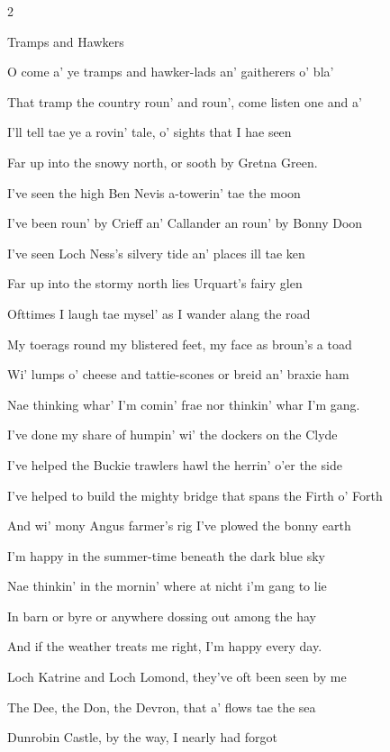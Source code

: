 \documentclass[10pt,twoside]{article}
\newcommand{\songtext}{\raggedright\fontsize{9bp}{9.15bp}\selectfont}
\newenvironment{songcolumns}
  {\begin{multicols*}{2}\songtext}
  {\end{multicols*}}
\newcommand{\songtitle}[1]{%
  \par\addvspace{9bp}%
  {\titleface\fontsize{14.5bp}{15bp}\selectfont #1\par}%
  \nobreak\vskip 2bp%
}
\newcommand{\lyric}[1]{%
  \hangindent=9bp\relax
  #1\par
}
\newenvironment{stanza}{\par\begingroup}{\par\endgroup\addvspace{4bp}}
\newcommand{\chords}[1]{%
  \par\nobreak\vskip 2bp
  {\chordface\fontsize{10bp}{11bp}\selectfont\formatchords{#1}\par}%
  \addvspace{4bp}%
}
\begin{document}
\begin{songcolumns}

\songtitle{Tramps and Hawkers}
\begin{stanza}
  \lyric{O come a' ye tramps and hawker-lads an' gaitherers o' bla'}
  \lyric{That tramp the country roun' and roun', come listen one and a'}
  \lyric{I'll tell tae ye a rovin' tale, o' sights that I hae seen}
  \lyric{Far up into the snowy north, or sooth by Gretna Green.}
  \chords{G - - - Am - - - C - - - G - - - /\\
          G - - - Em - - - G - - - Em - - - /\\
          G - - - Em - - - G - - - Em - - - /\\
          G - G7 - Am - G - - - C - G - - - /}
\end{stanza}
\begin{stanza}
  \lyric{I've seen the high Ben Nevis a-towerin' tae the moon}
  \lyric{I've been roun' by Crieff an' Callander an roun' by Bonny Doon}
  \lyric{I've seen Loch Ness's silvery tide an' places ill tae ken}
  \lyric{Far up into the stormy north lies Urquart's fairy glen}
\end{stanza}
\begin{stanza}
  \lyric{Ofttimes I laugh tae mysel' as I wander alang the road}
  \lyric{My toerags round my blistered feet, my face as broun's a toad}
  \lyric{Wi' lumps o' cheese and tattie-scones or breid an' braxie ham}
  \lyric{Nae thinking whar' I'm comin' frae nor thinkin' whar I'm gang.}
\end{stanza}
\begin{stanza}
  \lyric{I've done my share of humpin' wi' the dockers on the Clyde}
  \lyric{I've helped the Buckie trawlers hawl the herrin' o'er the side}
  \lyric{I've helped to build the mighty bridge that spans the Firth o' Forth}
  \lyric{And wi' mony Angus farmer's rig I've plowed the bonny earth}
\end{stanza}
\begin{stanza}
  \lyric{I'm happy in the summer-time beneath the dark blue sky}
  \lyric{Nae thinkin' in the mornin' where at nicht i'm gang to lie}
  \lyric{In barn or byre or anywhere dossing out among the hay}
  \lyric{And if the weather treats me right, I'm happy every day.}
\end{stanza}
\begin{stanza}
  \lyric{Loch Katrine and Loch Lomond, they've oft been seen by me}
  \lyric{The Dee, the Don, the Devron, that a' flows tae the sea}
  \lyric{Dunrobin Castle, by the way, I nearly had forgot}

\end{stanza}
\end{songcolumns}
\end{document}
